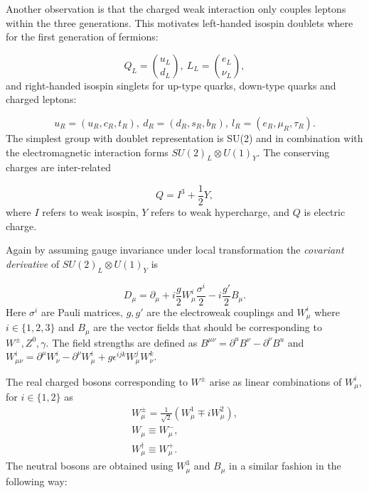 Another observation is that the charged weak interaction only couples leptons within the three generations. This motivates left-handed isospin doublets where for the first generation of fermions:

\begin{equation}
Q_{L} = \binom{u_{L}}{d_{L}}, ~L_{L} = \binom{e_{L}}{\nu_{L}},
	\label{eq:defdou}
\end{equation}
and right-handed isospin singlets for up-type quarks, down-type quarks and charged leptons:

\begin{equation}
	u_{R}=(u_{R},c_{R},t_{R}),~
	d_{R}=(d_{R},s_{R},b_{R}),~
	l_{R}=(e_{R},\mu_{R},\tau_{R}).
	\label{eq:defsin}
\end{equation}
The simplest group with doublet representation is SU(2) and in combination with the electromagnetic interaction forms $SU(2)_{L} \otimes U(1)_{Y}$. The conserving charges are inter-related 

\begin{equation}
Q=I^{3} + \frac{1}{2}Y,
\end{equation}
where $I$ refers to weak isospin, $Y$ refers to weak hypercharge, and $Q$ is electric charge.

Again by assuming gauge invariance under local transformation the \textit{covariant derivative} of $SU(2)_{L}\otimes U(1)_{Y}$ is 

\begin{equation}
	D_{\mu} = \partial_{\mu} + i\frac{g}{2}W_{\mu}^{i} \frac{\sigma^{i}}{2} - i \frac{g'}{2}B_{\mu}. 
\label{eq:covdev}
\end{equation}
Here $\sigma^{i}$ are Pauli matrices, $g,g'$ are the electroweak couplings and $W_{\mu}^{i}$ where $i\in\{1,2,3\}$ and $B_{\mu}$ are the vector fields that should be corresponding to $W^{\pm},Z^{0},\gamma$.
The field strengths are defined as $B^{\mu\nu}=\partial^{u}B^{\nu} - \partial^{\nu}B^{u}$ and $W^{i}_{\mu\nu} = \partial^{\mu}W^{i}_{\nu} - \partial^{\nu}W^{i}_{\mu}+ g\epsilon^{ijk}W_{\mu}^{j}W_{\nu}^{k}$.

The real charged bosons corresponding to $W^{\pm}$ arise as linear combinations of $W^{i}_{\mu}$, for $i\in\{1,2\}$ as
\begin{equation}
\begin{split}
W^{\pm}_{\mu} = \frac{1}{\sqrt{2}}(W^{1}_{\mu}\mp iW^{2}_{\mu}),
\\
W_{\mu} \equiv W^{-}_{\mu},
\\
W^{\dagger}_{\mu} \equiv W^{+}_{\mu}. 
\end{split}
\end{equation} 
The neutral bosons are obtained using $W_{\mu}^{3}$ and $B_{\mu}$ in a similar fashion in the following way:


